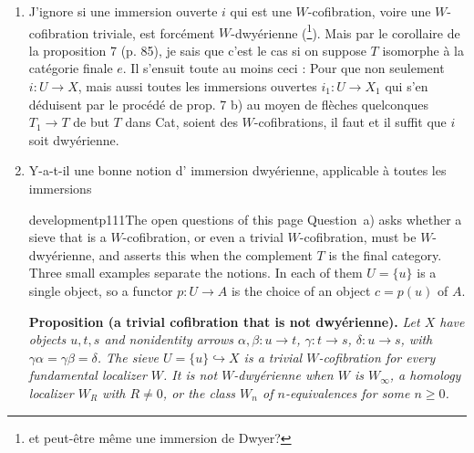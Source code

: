 \begin{enumerate}[label=\alph*)]
\item J'ignore si une immersion ouverte $i$ qui est une $W$-cofibration, voire une $W$-cofibration triviale, est forcément $W$-dwyérienne (\footnote{et peut-être même une immersion de Dwyer?}). Mais par le corollaire de la proposition 7 (p. 85), je sais que c'est le cas si on suppose $T$ isomorphe à la catégorie finale $e$. Il s'ensuit toute au moins ceci : Pour que non seulement $i:U\longrightarrow X$, mais aussi toutes les immersions ouvertes $i_1:U\longrightarrow X_1$ qui s'en déduisent par le procédé de prop. 7 b) au moyen de flèches quelconques $T_1\longrightarrow T$ de but $T$ dans Cat, soient des $W$-cofibrations, il faut et il suffit que $i$ soit dwyérienne. %

\item {}
Y-a-t-il une bonne notion d' immersion dwyérienne, applicable à toutes les immersions


\begin{dcomment}{development}{p111}{The open questions of this page}
Question~a) asks whether a sieve that is a $W$-cofibration, or even a trivial $W$-cofibration, must be $W$-dwy\'erienne, and asserts this when the complement $T$ is the final category. Three small examples separate the notions. In each of them $U=\{u\}$ is a single object, so a functor $p:U\to A$ is the choice of an object $c=p(u)$ of $A$.

\textbf{Proposition (a trivial cofibration that is not dwy\'erienne).}\ours
\textit{Let $X$ have objects $u,t,s$ and nonidentity arrows $\alpha,\beta:u\to t$, $\gamma:t\to s$, $\delta:u\to s$, with $\gamma\alpha=\gamma\beta=\delta$. The sieve $U=\{u\}\hookrightarrow X$ is a trivial $W$-cofibration for every fundamental localizer $W$. It is not $W$-dwy\'erienne when $W$ is $W_\infty$, a homology localizer $W_R$ with $R\neq0$, or the class $W_n$ of $n$-equivalences for some $n\geq0$.}


\end{dcomment}
\end{enumerate}
